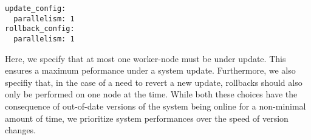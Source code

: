 \begin{lstlisting}
update_config:
  parallelism: 1
rollback_config:
  parallelism: 1
\end{lstlisting}

Here, we specify that at most one worker-node must be under update. This ensures a maximum peformance under a system update.
Furthermore, we also specifiy that, in the case of a need to revert a new update, rollbacks should also only be performed on one node at the time.
While both these choices have the consequence of out-of-date versions of the system being online for a non-minimal amount of time, we prioritize system performances over the speed of version changes.







